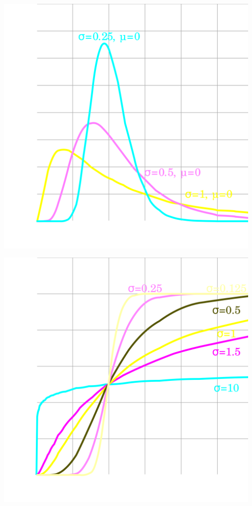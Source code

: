 \begin{frame}[fragile]
	\begin{minipage}{0.45\textwidth}
	\centering
	\includegraphics[scale=0.06]{figs/PDF-log_normal-neg.png}
	\end{minipage}
	\begin{minipage}{0.45\textwidth}
	\centering
	\includegraphics[scale=0.06]{figs/CDF-log_normal-neg.png}
\end{minipage}
\end{frame}
